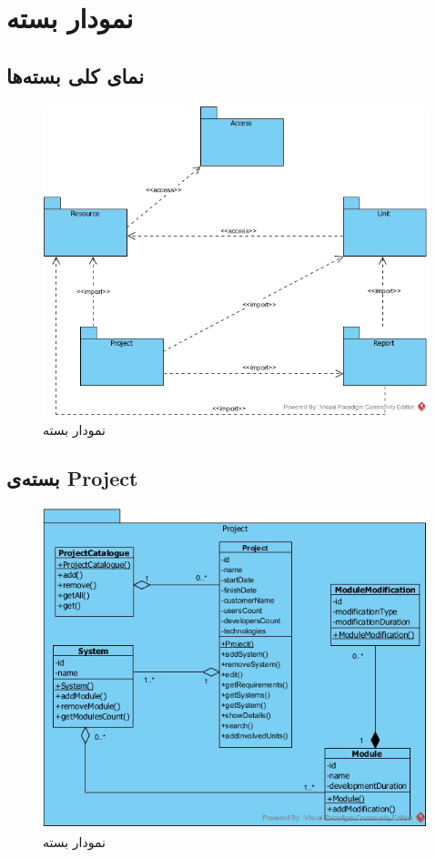 \chapter{نمودار بسته}
\section{نمای کلی بسته‌ها}
\begin{figure}[H]
	\centering
	\includegraphics[scale=0.5]{img/pkg/PackageDiagram}
	\caption{نمودار بسته}
\end{figure}
\section{بسته‌ی Project}
\begin{figure}[H]
	\centering
	\includegraphics[scale=0.8]{img/pkg/ProjectPackage}
	\caption{نمودار بسته}
\end{figure}

